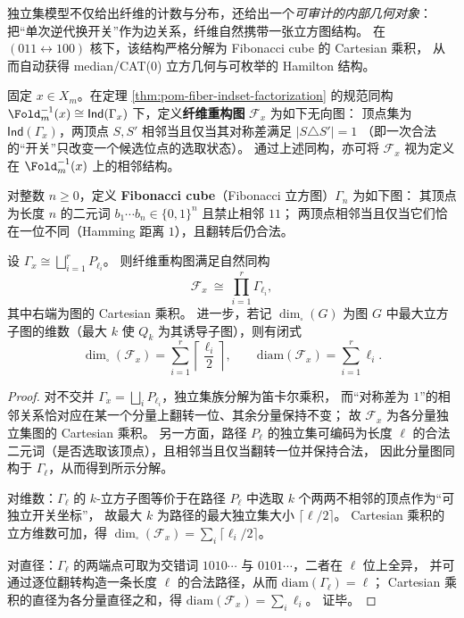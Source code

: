 独立集模型不仅给出纤维的计数与分布，还给出一个\emph{可审计的内部几何对象}：
把“单次逆代换开关”作为边关系，纤维自然携带一张立方图结构。
在 \((011\leftrightarrow 100)\) 核下，该结构严格分解为 Fibonacci cube 的 Cartesian 乘积，
从而自动获得 median/CAT(0) 立方几何与可枚举的 Hamilton 结构。

\begin{definition}[纤维重构图]\label{def:pom-fiber-reconstruction-graph}
固定 \(x\in X_m\)。在定理 \ref{thm:pom-fiber-indset-factorization} 的规范同构
\(\Fold_m^{-1}(x)\cong \mathsf{Ind}(\Gamma_x)\)
下，定义\textbf{纤维重构图} \(\mathcal F_x\) 为如下无向图：
顶点集为 \(\mathsf{Ind}(\Gamma_x)\)，两顶点 \(S,S'\) 相邻当且仅当其对称差满足
\(
|S\triangle S'|=1
\)
（即一次合法的“开关”只改变一个候选位点的选取状态）。
通过上述同构，亦可将 \(\mathcal F_x\) 视为定义在 \(\Fold_m^{-1}(x)\) 上的相邻结构。
\end{definition}

\begin{definition}\label{def:pom-fibonacci-cube}
对整数 \(n\ge 0\)，定义 \textbf{Fibonacci cube}（Fibonacci 立方图）\(\Gamma_n\) 为如下图：
其顶点为长度 \(n\) 的二元词 \(b_1\cdots b_n\in\{0,1\}^n\) 且禁止相邻 \(11\)；
两顶点相邻当且仅当它们恰在一位不同（Hamming 距离 \(1\)），且翻转后仍合法。
\end{definition}

\begin{theorem}\label{thm:pom-fiber-reconstruction-cartesian-product}
设 \(\Gamma_x\cong\bigsqcup_{i=1}^r P_{\ell_i}\)。
则纤维重构图满足自然同构
\[
\mathcal F_x\ \cong\ \prod_{i=1}^r \Gamma_{\ell_i},
\]
其中右端为图的 Cartesian 乘积。
进一步，若记 \(\dim_{\square}(G)\) 为图 \(G\) 中最大立方子图的维数（最大 \(k\) 使 \(Q_k\) 为其诱导子图），则有闭式
\[
\dim_{\square}(\mathcal F_x)=\sum_{i=1}^r \left\lceil\frac{\ell_i}{2}\right\rceil,
\qquad
\mathrm{diam}(\mathcal F_x)=\sum_{i=1}^r \ell_i.
\]
\end{theorem}
\begin{proof}
对不交并 \(\Gamma_x=\bigsqcup_i P_{\ell_i}\)，独立集族分解为笛卡尔乘积，
而“对称差为 \(1\)”的相邻关系恰对应在某一个分量上翻转一位、其余分量保持不变；
故 \(\mathcal F_x\) 为各分量独立集图的 Cartesian 乘积。
另一方面，路径 \(P_{\ell}\) 的独立集可编码为长度 \(\ell\) 的合法二元词（是否选取该顶点），且相邻当且仅当翻转一位并保持合法，
因此分量图同构于 \(\Gamma_{\ell}\)，从而得到所示分解。
\par
对维数：\(\Gamma_{\ell}\) 的 \(k\)-立方子图等价于在路径 \(P_{\ell}\) 中选取 \(k\) 个两两不相邻的顶点作为“可独立开关坐标”，
故最大 \(k\) 为路径的最大独立集大小 \(\lceil \ell/2\rceil\)。
Cartesian 乘积的立方维数可加，得 \(\dim_{\square}(\mathcal F_x)=\sum_i\lceil\ell_i/2\rceil\)。
\par
对直径：\(\Gamma_{\ell}\) 的两端点可取为交错词 \(1010\cdots\) 与 \(0101\cdots\)，二者在 \(\ell\) 位上全异，
并可通过逐位翻转构造一条长度 \(\ell\) 的合法路径，从而 \(\mathrm{diam}(\Gamma_{\ell})=\ell\)；
Cartesian 乘积的直径为各分量直径之和，得 \(\mathrm{diam}(\mathcal F_x)=\sum_i\ell_i\)。
证毕。
\end{proof}


